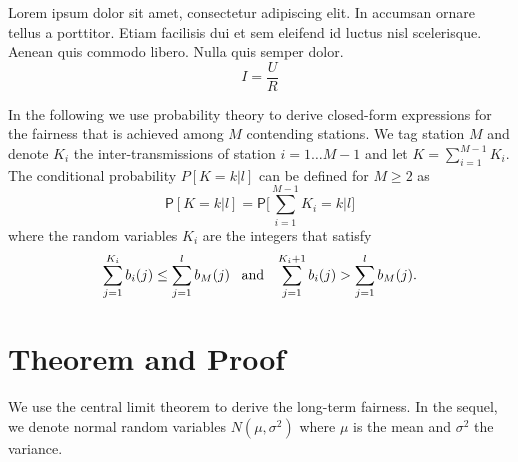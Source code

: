 Lorem ipsum dolor sit amet, consectetur adipiscing elit. In accumsan ornare tellus a porttitor. Etiam facilisis dui et sem eleifend id luctus nisl scelerisque. Aenean quis commodo libero. Nulla quis semper dolor.
%
\begin{equation}
 I = \frac{U}{R} 
\end{equation}

In the following we use probability theory to derive closed-form expressions for the fairness that is achieved among $M$ contending stations. We tag station $M$ and denote $K_i$ the inter-transmissions of station $i = 1 \dots M-1$ and let $K = \sum_{i=1}^{M-1} K_i$. The conditional probability $P[K\!=\!k|l]$ can be defined for $M \ge 2$ as
%
\begin{equation}
\mathsf{P}[K\!=\!k|l] = \mathsf{P} \Biggl[\sum_{i=1}^{M-1} K_i = k \Big| l \Biggr]
\label{eq:chapter03:exactpmf}
\end{equation}
%
where the random variables $K_i$ are the integers that satisfy
%
\begin{equation*}
\sum_{j=1}^{K_i} b_i(j) \le \sum_{j=1}^{l} b_M(j) \;\;\; \textmd{and} \;\;\; \sum_{j=1}^{K_i+1} b_i(j) > \sum_{j=1}^{l} b_M(j) .
\end{equation*}


%
%
\section{Theorem and Proof}
\label{sec:chapter03:theorem}
We use the central limit theorem to derive the long-term fairness. In the sequel, we denote normal random variables $N(\mu,\sigma^2)$ where $\mu$ is the mean and $\sigma^2$ the variance.
%

